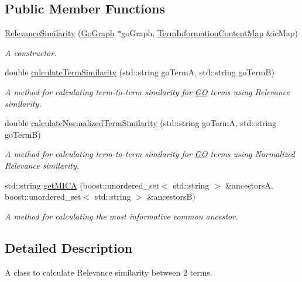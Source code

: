 \subsection*{Public Member Functions}
\begin{DoxyCompactItemize}
\item 
\hyperlink{classRelevanceSimilarity_a8c53e47a65cc1cb78aca2e94671b6534}{Relevance\+Similarity} (\hyperlink{classGoGraph}{Go\+Graph} $\ast$go\+Graph, \hyperlink{classTermInformationContentMap}{Term\+Information\+Content\+Map} \&ic\+Map)
\begin{DoxyCompactList}\small\item\em A constructor. \end{DoxyCompactList}\item 
double \hyperlink{classRelevanceSimilarity_a77fd7721c3c98611328f97b6b8c3f9e3}{calculate\+Term\+Similarity} (std\+::string go\+TermA, std\+::string go\+TermB)
\begin{DoxyCompactList}\small\item\em A method for calculating term-\/to-\/term similarity for \hyperlink{namespaceGO}{GO} terms using Relevance similarity. \end{DoxyCompactList}\item 
double \hyperlink{classRelevanceSimilarity_ad54bb47157112a225b353c47d1e2fad5}{calculate\+Normalized\+Term\+Similarity} (std\+::string go\+TermA, std\+::string go\+TermB)
\begin{DoxyCompactList}\small\item\em A method for calculating term-\/to-\/term similarity for \hyperlink{namespaceGO}{GO} terms using Normalized Relevance similarity. \end{DoxyCompactList}\item 
std\+::string \hyperlink{classRelevanceSimilarity_aa1db55c7a378e45ff66565e5e1043a8e}{get\+M\+I\+CA} (boost\+::unordered\+\_\+set$<$ std\+::string $>$ \&ancestorsA, boost\+::unordered\+\_\+set$<$ std\+::string $>$ \&ancestorsB)
\begin{DoxyCompactList}\small\item\em A method for calculating the most informative common ancestor. \end{DoxyCompactList}\end{DoxyCompactItemize}


\subsection{Detailed Description}
A class to calculate Relevance similarity between 2 terms. 

